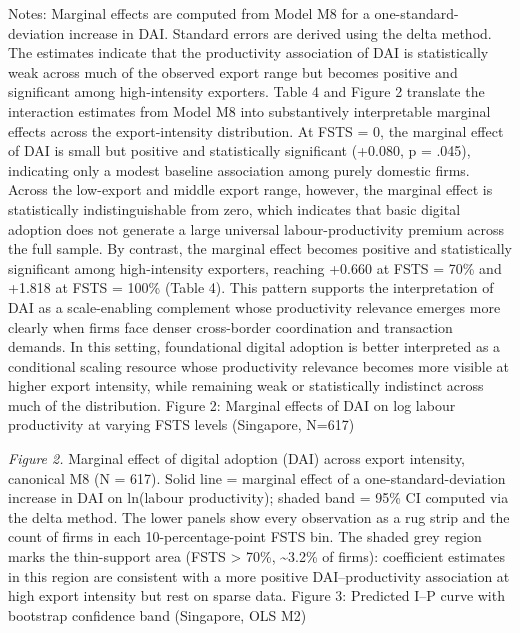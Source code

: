 \documentclass[
  12pt,a4paper]{article}
\begin{document}
Notes: Marginal effects are computed from Model M8 for a
one-standard-deviation increase in DAI. Standard errors are derived
using the delta method. The estimates indicate that the productivity
association of DAI is statistically weak across much of the observed
export range but becomes positive and significant among high-intensity
exporters. Table 4 and Figure 2 translate the interaction estimates from
Model M8 into substantively interpretable marginal effects across the
export-intensity distribution. At FSTS = 0, the marginal effect of DAI
is small but positive and statistically significant (+0.080, p = .045),
indicating only a modest baseline association among purely domestic
firms. Across the low-export and middle export range, however, the
marginal effect is statistically indistinguishable from zero, which
indicates that basic digital adoption does not generate a large
universal labour-productivity premium across the full sample. By
contrast, the marginal effect becomes positive and statistically
significant among high-intensity exporters, reaching +0.660 at FSTS =
70\% and +1.818 at FSTS = 100\% (Table 4). This pattern supports the
interpretation of DAI as a scale-enabling complement whose productivity
relevance emerges more clearly when firms face denser cross-border
coordination and transaction demands. In this setting, foundational
digital adoption is better interpreted as a conditional scaling resource
whose productivity relevance becomes more visible at higher export
intensity, while remaining weak or statistically indistinct across much
of the distribution. Figure 2: Marginal effects of DAI on log labour
productivity at varying FSTS levels (Singapore, N=617)

\emph{Figure 2.} Marginal effect of digital adoption (DAI) across export
intensity, canonical M8 (N = 617). Solid line = marginal effect of a
one-standard-deviation increase in DAI on ln(labour productivity);
shaded band = 95\% CI computed via the delta method. The lower panels
show every observation as a rug strip and the count of firms in each
10-percentage-point FSTS bin. The shaded grey region marks the
thin-support area (FSTS \textgreater{} 70\%, \textasciitilde3.2\% of
firms): coefficient estimates in this region are consistent with a more
positive DAI--productivity association at high export intensity but rest
on sparse data. Figure 3: Predicted I--P curve with bootstrap confidence
band (Singapore, OLS M2)
\end{document}
